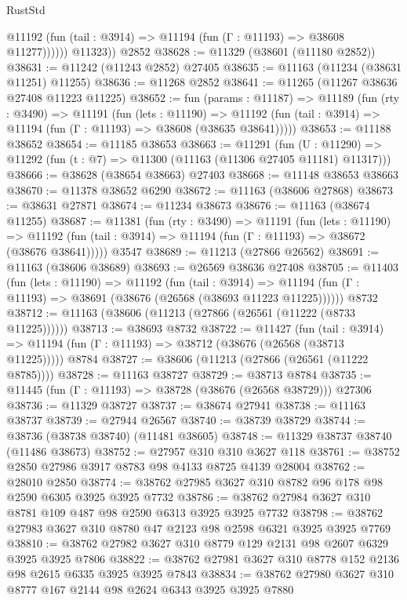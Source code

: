 \begin{lexlean}{RustStd}
\begin{coremodule}
              @11192 (fun (tail : @3914) => @11194 (fun (Γ : @11193) => @38608 @11277))))))
        @11323))
    @2852
@38628 := @11329 (@38601 (@11180 @2852))
@38631 := @11242 (@11243 @2852) @27405
@38635 := @11163 (@11234 (@38631 @11251) @11255)
@38636 := @11268 @2852
@38641 := @11265 (@11267 @38636 @27408 @11223 @11225)
@38652 := fun (params : @11187) =>
  @11189
    (fun (rty : @3490) =>
    @11191
      (fun (lets : @11190) =>
      @11192 (fun (tail : @3914) => @11194 (fun (Γ : @11193) => @38608 (@38635 @38641)))))
@38653 := @11188 @38652
@38654 := @11185 @38653
@38663 := @11291
    (fun (U : @11290) => @11292 (fun (t : @7) => @11300 (@11163 (@11306 @27405 @11181) @11317)))
@38666 := @38628 (@38654 @38663) @27403
@38668 := @11148 @38653 @38663
@38670 := @11378 @38652 @6290
@38672 := @11163 (@38606 @27868)
@38673 := @38631 @27871
@38674 := @11234 @38673
@38676 := @11163 (@38674 @11255)
@38687 := @11381
    (fun (rty : @3490) =>
    @11191
      (fun (lets : @11190) =>
      @11192 (fun (tail : @3914) => @11194 (fun (Γ : @11193) => @38672 (@38676 @38641)))))
    @3547
@38689 := @11213 (@27866 @26562)
@38691 := @11163 (@38606 @38689)
@38693 := @26569 @38636 @27408
@38705 := @11403
    (fun (lets : @11190) =>
    @11192
      (fun (tail : @3914) =>
      @11194 (fun (Γ : @11193) => @38691 (@38676 (@26568 (@38693 @11223 @11225))))))
    @8732
@38712 := @11163 (@38606 (@11213 (@27866 (@26561 (@11222 (@8733 @11225))))))
@38713 := @38693 @8732
@38722 := @11427
    (fun (tail : @3914) => @11194 (fun (Γ : @11193) => @38712 (@38676 (@26568 (@38713 @11225)))))
    @8784
@38727 := @38606 (@11213 (@27866 (@26561 (@11222 @8785))))
@38728 := @11163 @38727
@38729 := @38713 @8784
@38735 := @11445 (fun (Γ : @11193) => @38728 (@38676 (@26568 @38729))) @27306
@38736 := @11329 @38727
@38737 := @38674 @27941
@38738 := @11163 @38737
@38739 := @27944 @26567
@38740 := @38739 @38729
@38744 := @38736 (@38738 @38740) (@11481 @38605)
@38748 := @11329 @38737 @38740 (@11486 @38673)
@38752 := @27957 @310 @310 @3627 @118
@38761 := @38752 @2850 @27986 @3917 @8783 @98 @4133 @8725 @4139 @28004
@38762 := @28010 @2850
@38774 := @38762 @27985 @3627 @310 @8782 @96 @178 @98 @2590 @6305 @3925 @3925 @7732
@38786 := @38762 @27984 @3627 @310 @8781 @109 @487 @98 @2590 @6313 @3925 @3925 @7732
@38798 := @38762 @27983 @3627 @310 @8780 @47 @2123 @98 @2598 @6321 @3925 @3925 @7769
@38810 := @38762 @27982 @3627 @310 @8779 @129 @2131 @98 @2607 @6329 @3925 @3925 @7806
@38822 := @38762 @27981 @3627 @310 @8778 @152 @2136 @98 @2615 @6335 @3925 @3925 @7843
@38834 := @38762 @27980 @3627 @310 @8777 @167 @2144 @98 @2624 @6343 @3925 @3925 @7880

\end{coremodule}
\end{lexlean}
